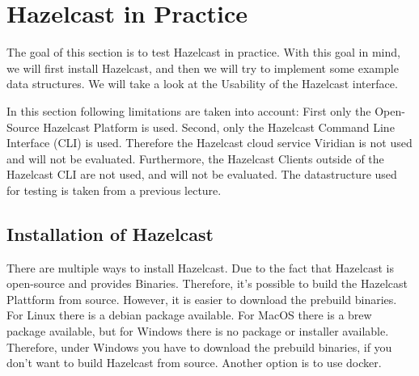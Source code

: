 
\section{Hazelcast in Practice}
The goal of this section is to test Hazelcast in practice. With this goal in
mind, we will first install Hazelcast, and then we will try to implement some
example data structures. We will take a look at the Usability of the Hazelcast
interface. 

In this section following limitations are taken into account: First only the
Open-Source Hazelcast Platform is used. Second, only the Hazelcast Command Line
Interface (CLI) is used. Therefore the Hazelcast cloud service Viridian is not
used and will not be evaluated. Furthermore, the Hazelcast Clients outside of
the Hazelcast CLI are not used, and will not be evaluated. The datastructure
used for testing is taken from a previous lecture.
\todo{}
\subsection{Installation of Hazelcast}
There are multiple ways to install Hazelcast. Due to the fact that Hazelcast is
open-source and provides Binaries. Therefore, it's possible to build the
Hazelcast Plattform from source. However, it is easier to download the prebuild
binaries. For Linux there is a debian package available. For MacOS there is a
brew package available, but for Windows there is no package or installer
available. Therefore, under Windows you have to download the prebuild binaries,
if you don't want to build Hazelcast from source. Another option is to use
docker. \parencite{hazelcast_installing_nodate}

